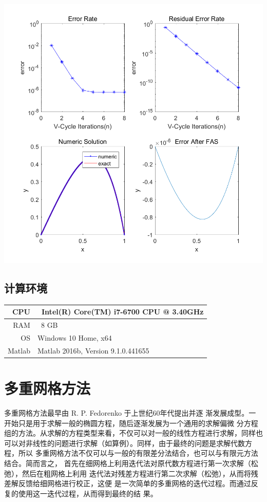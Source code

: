 \documentclass{article}
\begin{document}
\includegraphics[width=\textwidth]{figure2.png}


\subsection*{计算环境}
\begin{tabular}{r|l}
    \hline
    CPU    & \ Intel(R) Core(TM) i7-6700 CPU @ 3.40GHz \\
    \hline
    RAM    & \ 8 GB                                    \\
    \hline
    OS     & Windows 10 Home, x64                      \\
    \hline
    Matlab & Matlab 2016b, Version 9.1.0.441655        \\
    \hline
\end{tabular}


\section{多重网格方法}
多重网格方法最早由 R. P. Fedorenko\cite{Fedorenko1962A} 于上世纪60年代提出并逐
渐发展成型。一开始只是用于求解一般的椭圆方程，随后逐渐发展为一个通用的求解偏微
分方程组的方法。从求解的方程类型来看，不仅可以对一般的线性方程进行求解，同样也
可以对非线性的问题进行求解（如算例）。同样，由于最终的问题是求解代数方程，所以
多重网格方法不仅可以与一般的有限差分法结合，也可以与有限元方法结合。简而言之，
首先在细网格上利用迭代法对原代数方程进行第一次求解（松弛），然后在粗网格上利用
迭代法对残差方程进行第二次求解（松弛），从而将残差解反馈给细网格进行校正，这便
是一次简单的多重网格的迭代过程。而通过反复的使用这一迭代过程，从而得到最终的结
果。
\end{document}

